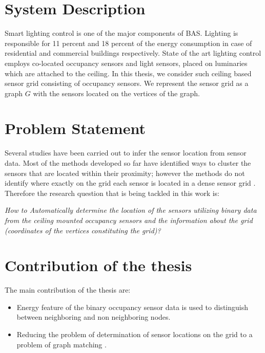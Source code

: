 \section{System Description}
Smart lighting control is one of the major components of BAS. Lighting is responsible for 11 percent  and 18 percent of the energy consumption in case of residential and commercial buildings respectively\cite{website}. 
State of the art lighting control employs co-located occupancy sensors and light sensors, placed on luminaries which are attached to the ceiling\cite{pandharipande2015smart,caicedo2016smart,van2014distributed}.
In this thesis, we consider such ceiling based sensor grid consisting of occupancy sensors. We represent the sensor grid as a graph $G$ with the sensors located on the vertices of the graph.

\section{Problem Statement}

Several studies \cite{Hong:2013:TAS:2528282.2528302,doi:10.1061/9780784413616.226,Koc:2014:CLC:2674061.2674075,Lu:2014:SBS:2648771.2629441,ellis2012creating,muller2014automated,marinakis2005learning} have been carried out to infer the sensor location from sensor data. Most of the methods developed so far have identified ways to cluster the sensors that are located within their proximity; however the methods do not identify where exactly on the grid each sensor is located in a dense sensor grid \cite{Hong:2013:TAS:2528282.2528302,doi:10.1061/9780784413616.226,Koc:2014:CLC:2674061.2674075}.  Therefore the research question that is being tackled in this work is:

\textit{How to Automatically determine the location of the sensors utilizing binary data from the ceiling mounted occupancy sensors and the information about the grid (coordinates of the vertices constituting the grid)?}

\section{Contribution of the thesis}
The main contribution of the thesis are:
\begin{itemize}
\item Energy feature of the binary occupancy sensor data is used to distinguish between neighboring and non neighboring nodes.
\item Reducing the problem of determination of sensor locations  on the grid to a problem of graph matching \cite{conte2004thirty}.
\end{itemize}

